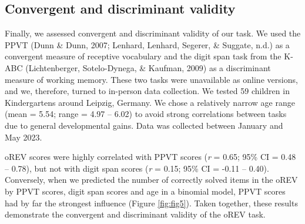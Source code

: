 \documentclass[
  man,floatsintext]{apa6}
\begin{document}
\hypertarget{convergent-and-discriminant-validity}{%
\subsection{Convergent and discriminant validity}\label{convergent-and-discriminant-validity}}

Finally, we assessed convergent and discriminant validity of our task. We used the PPVT (Dunn \& Dunn, 2007; Lenhard, Lenhard, Segerer, \& Suggate, n.d.) as a convergent measure of receptive vocabulary and the digit span task from the K-ABC (Lichtenberger, Sotelo-Dynega, \& Kaufman, 2009) as a discriminant measure of working memory. These two tasks were unavailable as online versions, and we, therefore, turned to in-person data collection. We tested 59 children in Kindergartens around Leipzig, Germany. We chose a relatively narrow age range (mean = 5.54; range = 4.97 -- 6.02) to avoid strong correlations between tasks due to general developmental gains. Data was collected between January and May 2023.

oREV scores were highly correlated with PPVT scores (\emph{r} = 0.65; 95\% CI = 0.48 -- 0.78), but not with digit span scores (\emph{r} = 0.15; 95\% CI = -0.11 -- 0.40). Conversely, when we predicted the number of correctly solved items in the oREV by PPVT scores, digit span scores and age in a binomial model, PPVT scores had by far the strongest influence (Figure \ref{fig:fig5}). Taken together, these results demonstrate the convergent and discriminant validity of the oREV task.
\end{document}
